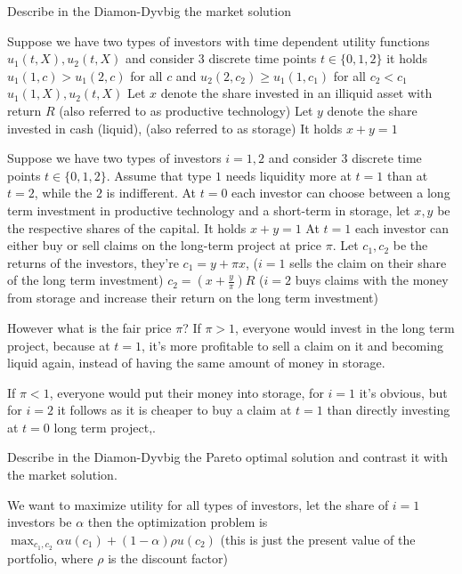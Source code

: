Describe in the Diamon-Dyvbig the market solution

Suppose we have two types of investors with time dependent utility functions
\( u_1(t, X), u_2(t, X) \) and consider 3 discrete time points \( t \in \{0, 1, 2\} \)
it holds \( u_1(1, c) > u_1(2, c) \) for all \( c \) and \( u_2(2, c_2) \geq u_1(1, c_1) \)
for all \( c_2 < c_1 \)
\( u_1(1, X), u_2(t, X) \)
Let \( x \) denote the share invested in an illiquid asset with return \( R \) 
(also referred to as productive technology)
Let \( y \) denote the share invested in cash (liquid), (also referred to as storage)
It holds
\( x + y = 1 \)

Suppose we have two types of investors \( i = 1, 2 \) and consider 3 discrete time points \( t \in \{0, 1, 2\} \).
Assume that type \( 1 \) needs liquidity more at \( t = 1 \) than at \( t = 2 \), while the \( 2 \) is indifferent.
At \( t = 0 \) each investor can choose between a long term investment in productive technology
and a short-term in storage, let \( x, y \) be the respective shares of the capital.
It holds 
\( x + y = 1 \)
At \( t = 1 \)  each investor can either buy or sell claims on the long-term project at price \( \pi \).
Let \( c_1, c_2 \) be the returns of the investors, they're
\( c_1 =  y + \pi x \), 
(\( i = 1 \) sells the claim on their share of the long term investment)
\( c_2 = (x + \frac{y}{\pi})R\) 
(\( i = 2 \) buys claims with the money from storage and increase their return on the long term investment)

However what is the fair price \( \pi \)?
If \( \pi > 1 \), everyone would invest in the long term project, because
at \( t = 1 \), it's more profitable to sell a claim on it and becoming liquid
again, instead of having the same amount of money in storage.

If \( \pi < 1 \), everyone would put their money into storage, for \( i = 1 \) it's obvious,
but for \( i = 2 \) it follows as it is cheaper to buy a claim at \( t = 1 \) than directly investing
at \( t = 0 \) long term project,.


Describe in the Diamon-Dyvbig the Pareto optimal solution
and contrast it with the market solution.

We want to maximize utility for all types of investors, let the share 
of \( i = 1 \) investors be \( \alpha \) then the optimization problem is
\( \max_{c_1, c_2} \alpha u(c_1) + (1 - \alpha)\rho u(c_2) \) 
(this is just the present value of the portfolio, where \( \rho \) is the 
discount factor)

